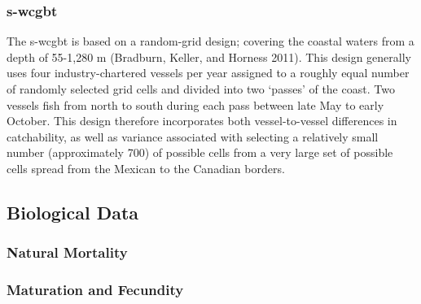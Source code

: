 \documentclass[11pt,
  english,
  a4paper,
]{article}
\begin{document}
\leavevmode\tagmcend\tagstructend\par


\hypertarget{section-3}{%
\subsubsection{\texorpdfstring{\acrlong{s-wcgbt}}{}}\label{section-3}}

\leavevmode\tagmcend\tagstructend


The \Gls{s-wcgbt} is based on a random-grid design; covering the coastal waters from a depth of 55-1,280 m {(Bradburn, Keller, and Horness 2011)\leavevmode\tagmcend\tagstructend}. This design generally uses four industry-chartered vessels per year assigned to a roughly equal number of randomly selected grid cells and divided into two `passes' of the coast. Two vessels fish from north to south during each pass between late May to early October. This design therefore incorporates both vessel-to-vessel differences in catchability, as well as variance associated with selecting a relatively small number (approximately 700) of possible cells from a very large set of possible cells spread from the Mexican to the Canadian borders.

\leavevmode\tagmcend\tagstructend\par


\hypertarget{biological-data}{%
\subsection{Biological Data}\label{biological-data}}

\leavevmode\tagmcend\tagstructend


\hypertarget{natural-mortality}{%
\subsubsection{Natural Mortality}\label{natural-mortality}}

\leavevmode\tagmcend\tagstructend


\hypertarget{maturation-and-fecundity}{%
\subsubsection{Maturation and Fecundity}\label{maturation-and-fecundity}}
\end{document}
